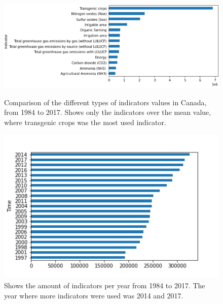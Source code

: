 \documentclass[11pt]{article}
\numberwithin{equation}{section}
\begin{document}
\begin{figure}[t]
\centering
\includegraphics[width=0.50\paperwidth, clip=true, trim=0mm 0mm 0mm 0mm]{figures/Indicator_Value}\\

\caption{ Comparison of the different types of indicators  values in Canada, from 1984 to 2017. Shows only the indicators over the mean value, where transgenic crops was the most used indicator.
}
\label{Example1fig}
\end{figure}
\begin{figure}[t]
\centering
\includegraphics[width=0.30\paperwidth, clip=true, trim=0mm 0mm 0mm 0mm]{figures/Time_Value}\qquad

\caption{Shows  the amount of indicators per year from 1984 to 2017. The year where more  indicators were used was 2014 and 2017.
}
\label{Example2fig}
\end{figure}
\end{document}
